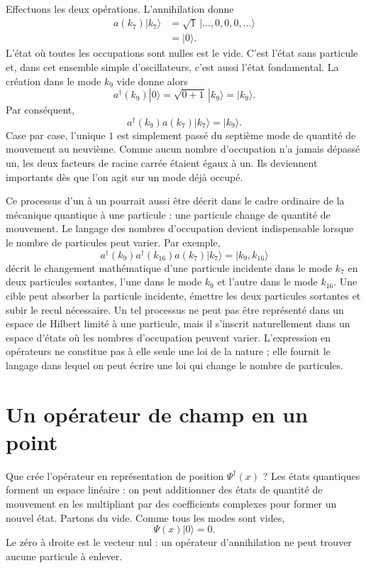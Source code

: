 Effectuons les deux opérations. L’annihilation donne
\begin{align}
a(k_7)|k_7\rangle
&=
\sqrt{1}\,|\ldots,0,0,0,\ldots\rangle\\
&=|0\rangle.
\end{align}
L’état où toutes les occupations sont nulles est le vide. C’est l’état sans particule et, dans cet ensemble simple d’oscillateurs, c’est aussi l’état fondamental. La création dans le mode \(k_9\) vide donne alors
\begin{equation}
a^\dagger(k_9)|0\rangle
=\sqrt{0+1}\,|k_9\rangle
=|k_9\rangle.
\end{equation}
Par conséquent,
\begin{equation}
a^\dagger(k_9)a(k_7)|k_7\rangle=|k_9\rangle.
\end{equation}
Case par case, l’unique \(1\) est simplement passé du septième mode de quantité de mouvement au neuvième. Comme aucun nombre d’occupation n’a jamais dépassé un, les deux facteurs de racine carrée étaient égaux à un. Ils deviennent importants dès que l’on agit sur un mode déjà occupé.

Ce processus d’un à un pourrait aussi être décrit dans le cadre ordinaire de la mécanique quantique à une particule : une particule change de quantité de mouvement. Le langage des nombres d’occupation devient indispensable lorsque le nombre de particules peut varier. Par exemple,
\begin{equation}
a^\dagger(k_9)a^\dagger(k_{16})a(k_7)|k_7\rangle
=|k_9,k_{16}\rangle
\end{equation}
décrit le changement mathématique d’une particule incidente dans le mode \(k_7\) en deux particules sortantes, l’une dans le mode \(k_9\) et l’autre dans le mode \(k_{16}\). Une cible peut absorber la particule incidente, émettre les deux particules sortantes et subir le recul nécessaire. Un tel processus ne peut pas être représenté dans un espace de Hilbert limité à une particule, mais il s’inscrit naturellement dans un espace d’états où les nombres d’occupation peuvent varier. L’expression en opérateurs ne constitue pas à elle seule une loi de la nature ; elle fournit le langage dans lequel on peut écrire une loi qui change le nombre de particules.

\section{Un opérateur de champ en un point}

Que crée l’opérateur en représentation de position \(\Psi^\dagger(x)\) ? Les états quantiques forment un espace linéaire : on peut additionner des états de quantité de mouvement en les multipliant par des coefficients complexes pour former un nouvel état. Partons du vide. Comme tous les modes sont vides,
\begin{equation}
\Psi(x)|0\rangle=0.
\end{equation}
Le zéro à droite est le vecteur nul : un opérateur d’annihilation ne peut trouver aucune particule à enlever.

